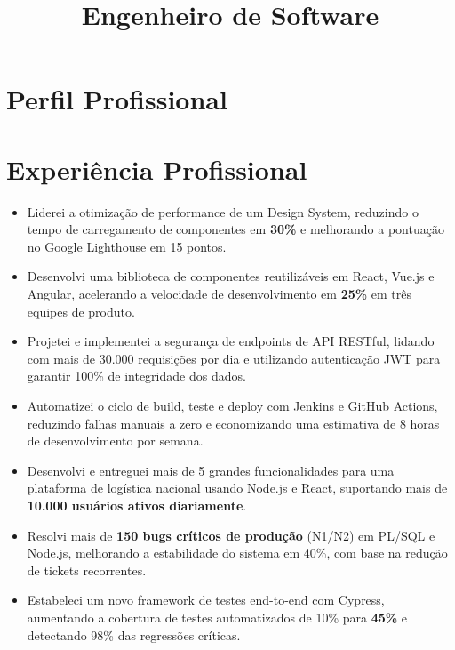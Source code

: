 \documentclass[10pt,a4paper,sans]{moderncv}
\title{Engenheiro de Software}
\begin{document}
\makecvtitle

\section{Perfil Profissional}

\section{Experiência Profissional}
{
    \begin{itemize}
        \item Liderei a otimização de performance de um Design System, reduzindo o tempo de carregamento de componentes em \textbf{30\%} e melhorando a pontuação no Google Lighthouse em 15 pontos.
        \item Desenvolvi uma biblioteca de componentes reutilizáveis em React, Vue.js e Angular, acelerando a velocidade de desenvolvimento em \textbf{25\%} em três equipes de produto.
        \item Projetei e implementei a segurança de endpoints de API RESTful, lidando com mais de 30.000 requisições por dia e utilizando autenticação JWT para garantir 100\% de integridade dos dados.
        \item Automatizei o ciclo de build, teste e deploy com Jenkins e GitHub Actions, reduzindo falhas manuais a zero e economizando uma estimativa de 8 horas de desenvolvimento por semana.
    \end{itemize}
}

{
    \begin{itemize}
        \item Desenvolvi e entreguei mais de 5 grandes funcionalidades para uma plataforma de logística nacional usando Node.js e React, suportando mais de \textbf{10.000 usuários ativos diariamente}.
        \item Resolvi mais de \textbf{150 bugs críticos de produção} (N1/N2) em PL/SQL e Node.js, melhorando a estabilidade do sistema em 40\%, com base na redução de tickets recorrentes.
        \item Estabeleci um novo framework de testes end-to-end com Cypress, aumentando a cobertura de testes automatizados de 10\% para \textbf{45\%} e detectando 98\% das regressões críticas.
    \end{itemize}
}
\end{document}
